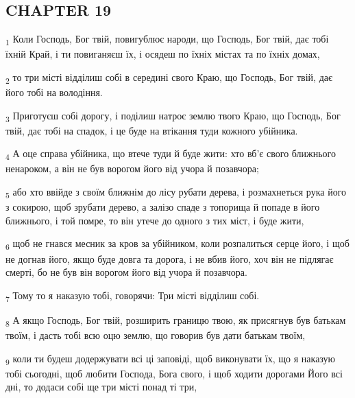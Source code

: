 \subsection{CHAPTER 19}
\begin{tcolorbox}
\textsubscript{1} Коли Господь, Бог твій, повигублює народи, що Господь, Бог твій, дає тобі їхній Край, і ти повиганяєш їх, і осядеш по їхніх містах та по їхніх домах,
\end{tcolorbox}
\begin{tcolorbox}
\textsubscript{2} то три місті відділиш собі в середині свого Краю, що Господь, Бог твій, дає його тобі на володіння.
\end{tcolorbox}
\begin{tcolorbox}
\textsubscript{3} Приготуєш собі дорогу, і поділиш натроє землю твого Краю, що Господь, Бог твій, дає тобі на спадок, і це буде на втікання туди кожного убійника.
\end{tcolorbox}
\begin{tcolorbox}
\textsubscript{4} А оце справа убійника, що втече туди й буде жити: хто вб'є свого ближнього ненароком, а він не був ворогом його від учора й позавчора;
\end{tcolorbox}
\begin{tcolorbox}
\textsubscript{5} або хто ввійде з своїм ближнім до лісу рубати дерева, і розмахнеться рука його з сокирою, щоб зрубати дерево, а залізо спаде з топорища й попаде в його ближнього, і той помре, то він утече до одного з тих міст, і буде жити,
\end{tcolorbox}
\begin{tcolorbox}
\textsubscript{6} щоб не гнався месник за кров за убійником, коли розпалиться серце його, і щоб не догнав його, якщо буде довга та дорога, і не вбив його, хоч він не підлягає смерті, бо не був він ворогом його від учора й позавчора.
\end{tcolorbox}
\begin{tcolorbox}
\textsubscript{7} Тому то я наказую тобі, говорячи: Три місті відділиш собі.
\end{tcolorbox}
\begin{tcolorbox}
\textsubscript{8} А якщо Господь, Бог твій, розширить границю твою, як присягнув був батькам твоїм, і дасть тобі всю оцю землю, що говорив був дати батькам твоїм,
\end{tcolorbox}
\begin{tcolorbox}
\textsubscript{9} коли ти будеш додержувати всі ці заповіді, щоб виконувати їх, що я наказую тобі сьогодні, щоб любити Господа, Бога свого, і щоб ходити дорогами Його всі дні, то додаси собі ще три місті понад ті три,
\end{tcolorbox}
